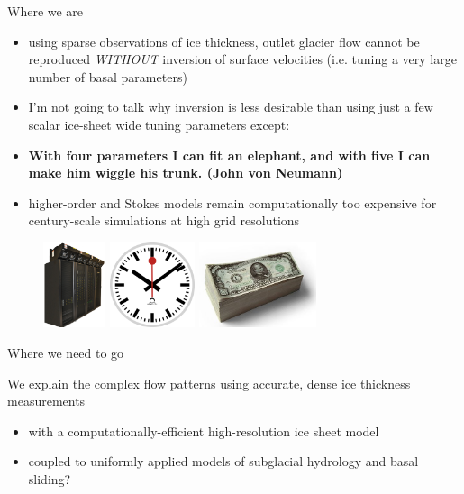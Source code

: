 \documentclass[hide notes,intlimits]{beamer}
\begin{document}
\begin{frame}{Where we are}
  \begin{itemize}[<+-| alert@+>]
  \item using sparse observations of ice thickness, outlet glacier flow cannot be reproduced \emph{WITHOUT} inversion of surface velocities (i.e. tuning a very large number of basal parameters)
  \item I'm not going to talk why inversion is less desirable than using just a few scalar ice-sheet wide tuning parameters except:
  \item \bf{With four parameters I can fit an elephant, and with five I can make him wiggle his trunk.} (John von Neumann)
  \item higher-order and Stokes models remain computationally too expensive for century-scale simulations at high grid resolutions
  \end{itemize}
  \begin{figure}
    \includegraphics[height=2.5cm]{pacman} \qquad
    \includegraphics[height=2.5cm]{swiss_railway_clock} \qquad
    \includegraphics[height=2.5cm]{1000-dollar-bills}
  \end{figure}
\end{frame}


\begin{frame}{Where we need to go}
  \begin{block}{We explain the complex flow patterns using accurate, dense ice thickness measurements}
    \begin{itemize}
    \item with a computationally-efficient high-resolution ice sheet model
    \item coupled to uniformly applied models of subglacial hydrology and basal sliding?
    \end{itemize}
  \end{block}
\end{frame}
\end{document}
